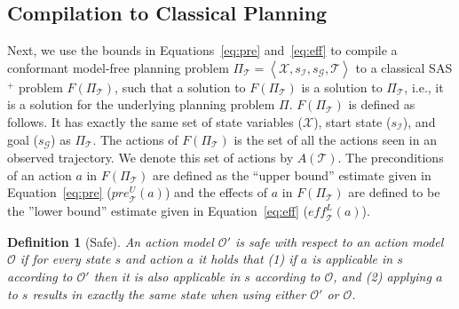 \documentclass{article}
\newtheorem{definition}{Definition}
\newcommand{\tuple}[1]{\ensuremath{\left \langle #1 \right \rangle }}
\newcommand{\SAS}{SAS$^+$}
\newcommand{\cmfp}{conformant model-free planning}
\newcommand{\eff}{\textit{eff}}
\newcommand{\pre}{\textit{pre}}
\begin{document}
	
	
	\subsection{Compilation to Classical Planning} 
	Next, we use the bounds in Equations~\ref{eq:pre} and~\ref{eq:eff} to compile a \cmfp{} problem 
	$\Pi_\mathcal{T}=\tuple{\mathcal{X},s_\mathcal{I}, s_\mathcal{G}, \mathcal{T}}$ 
	to a classical \SAS{} problem $F(\Pi_\mathcal{T})$, such that a solution to $F(\Pi_\mathcal{T})$ 
	is a solution to $\Pi_\mathcal{T}$, i.e., it is a solution for the underlying planning problem $\Pi$. 
	$F(\Pi_\mathcal{T})$ is defined as follows. It has exactly the same set of 
	state variables ($\mathcal{X}$), start state ($s_\mathcal{I}$), and goal ($s_\mathcal{G}$) as $\Pi_\mathcal{T}$. The actions of $F(\Pi_\mathcal{T})$ is the set of all the actions seen in an observed trajectory. We denote this set of actions by $A(\mathcal{T})$. 
	The preconditions of an action $a$ in  $F(\Pi_\mathcal{T})$ 
	are defined as the ``upper bound'' estimate given in Equation~\ref{eq:pre} ($\pre_\mathcal{T}^U(a)$) and the effects of $a$ in  $F(\Pi_\mathcal{T})$  
	are defined to be the ''lower bound'' estimate given in 
	Equation~\ref{eq:eff} ($\eff_\mathcal{T}^L(a)$).
	
	\begin{definition}[Safe]
		An action model $\mathcal{O}'$ is safe with respect to an action model $\mathcal{O}$
		if for every state $s$ and action $a$ it holds that (1) if $a$ is applicable in $s$ according to $\mathcal{O}'$ then it is also applicable in $s$ according to $\mathcal{O}$, and (2) applying $a$ to $s$ results in exactly the same state when using either $\mathcal{O}'$ or $\mathcal{O}$. 
		\label{def:safe}
	\end{definition}
	
\end{document}

